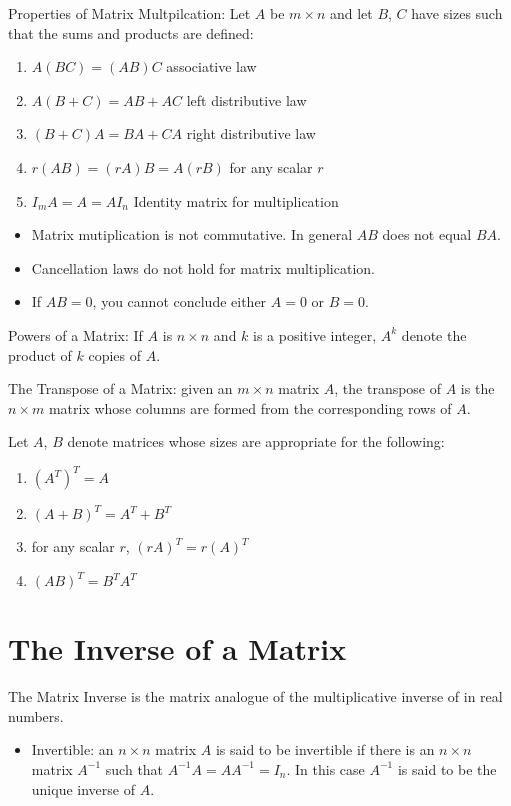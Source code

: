 \documentclass[../linalg.tex]{subfiles}
\begin{document}
Properties of Matrix Multpilcation: Let $A$ be $m\times n$ and let $B$, $C$ have sizes such that the sums and products are defined:
\begin{enumerate}
    \item $A(BC)=(AB)C$ associative law 
    \item $A(B+C)=AB+AC$ left distributive law 
    \item $(B+C)A=BA+CA$ right distributive law 
    \item $r(AB)=(rA)B = A(rB)$ for any scalar $r$
    \item $I_mA=A=AI_n$ Identity matrix for multiplication 
\end{enumerate}
\begin{itemize}
    \item Matrix mutiplication is not commutative. In general $AB$ does not equal $BA$.
    \item Cancellation laws do not hold for matrix multiplication.
    \item If $AB=0$, you cannot conclude either $A=0$ or $B=0$.
\end{itemize}
Powers of a Matrix: If $A$ is $n\times n$ and $k$ is a positive integer, $A^k$ denote the product of $k$ copies of $A$.

The Transpose of a Matrix: given an $m\times n$ matrix $A$, the transpose of $A$ is the $n\times m$ matrix whose columns are formed from the corresponding rows of $A$.
\begin{theorem}[Transpose]
    Let $A$, $B$ denote matrices whose sizes are appropriate for the following:
    \begin{enumerate}
        \item $(A^T)^T=A$
        \item $(A+B)^T=A^T+B^T$
        \item for any scalar $r$, $(rA)^T=r(A)^T$
        \item $(AB)^T=B^TA^T$
    \end{enumerate}
\end{theorem}
\section{The Inverse of a Matrix}
The Matrix Inverse is the matrix analogue of the multiplicative inverse of in real numbers. 
\begin{itemize}
    \item Invertible: an $n\times n$ matrix $A$ is said to be invertible if there is an $n\times n$ matrix $A^{-1}$ such that $A^{-1}A=AA^{-1}=I_n$. In this case $A^{-1}$ is said to be the unique inverse of $A$.
\end{itemize}
\end{document}
